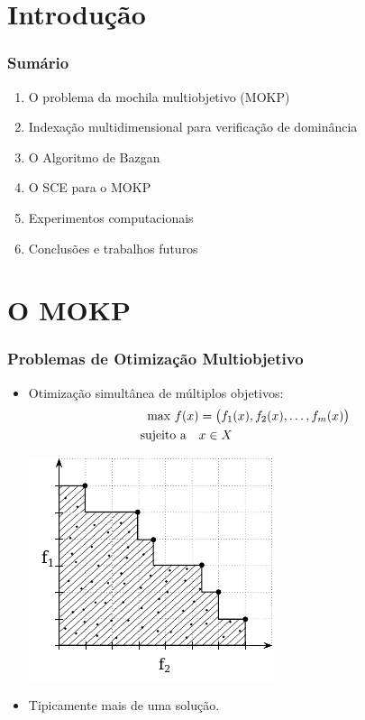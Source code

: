 \documentclass[10pt,xcolor=table,fleqn]{beamer}
\author[]{ \textbf{Marcos Daniel Valadão Baroni} }
\date{31 de julho de 2018}
\begin{document}
\section{Introdução}

\begin{frame}
	\frametitle{Sumário}
	\begin{enumerate}
		\item O problema da mochila multiobjetivo (MOKP)
    \item Indexação multidimensional para verificação de dominância
    \item O Algoritmo de Bazgan
		\item O SCE para o MOKP
		\item Experimentos computacionais
		\item Conclusões e trabalhos futuros
	\end{enumerate}
\end{frame}

\section{O MOKP}

\begin{frame}
	\frametitle{Problemas de Otimização Multiobjetivo}
  \begin{itemize}
    \item{Otimização simultânea de múltiplos objetivos:
    \begin{align*}
      \text{max} ~ f(x) &=
        \big(f_1(x)
        ,f_2(x)
        ,\ldots
        ,f_{m}(x)\big) \\
      \text{sujeito a} \quad & x \in X
    \end{align*}
    \begin{center}
      \includegraphics[scale=0.8]{../img/mokp/pareto-def}
    \end{center}
    }
    \item{ Tipicamente mais de uma solução.}
  \end{itemize}
\end{frame}
\end{document}
